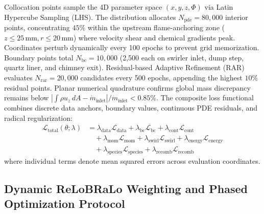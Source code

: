 \documentclass[reprint,aps,prfluids,superscriptaddress,twocolumn,floatfix]{revtex4-2}
\begin{document}
Collocation points sample the 4D parameter space $(x, y, z, \Phi)$ via Latin Hypercube Sampling (LHS). The distribution allocates $N_{\text{pde}} = 80,000$ interior points, concentrating $45\%$ within the upstream flame-anchoring zone ($z \le 25\,\text{mm}, r \le 20\,\text{mm}$) where velocity shear and chemical gradients peak. Coordinates perturb dynamically every 100 epochs to prevent grid memorization. Boundary points total $N_{\text{bc}} = 10,000$ (2,500 each on swirler inlet, dump step, quartz liner, and chimney exit). Residual-based Adaptive Refinement (RAR) evaluates $N_{\text{rar}} = 20,000$ candidates every 500 epochs, appending the highest $10\%$ residual points. Planar numerical quadrature confirms global mass discrepancy remains below $|\int \rho u_z \, dA - \dot{m}_{\text{inlet}}| / \dot{m}_{\text{inlet}} < 0.85\%$. The composite loss functional combines discrete data anchors, boundary values, continuous PDE residuals, and radical regularization:
\begin{align}
    \mathcal{L}_{\text{total}}(\theta; \lambda) &= \lambda_{\text{data}} \mathcal{L}_{\text{data}} + \lambda_{\text{bc}} \mathcal{L}_{\text{bc}} + \lambda_{\text{cont}} \mathcal{L}_{\text{cont}} \nonumber \\
    &\quad + \lambda_{\text{mom}} \mathcal{L}_{\text{mom}} + \lambda_{\text{swirl}} \mathcal{L}_{\text{swirl}} + \lambda_{\text{energy}} \mathcal{L}_{\text{energy}} \nonumber \\
    &\quad + \lambda_{\text{species}} \mathcal{L}_{\text{species}} + \lambda_{\text{recomb}} \mathcal{L}_{\text{recomb}}
    \label{eq:loss_composite}
\end{align}
where individual terms denote mean squared errors across evaluation coordinates.

\subsection{Dynamic ReLoBRaLo Weighting and Phased Optimization Protocol}
\label{subsec:relobralo_protocol}
\end{document}
